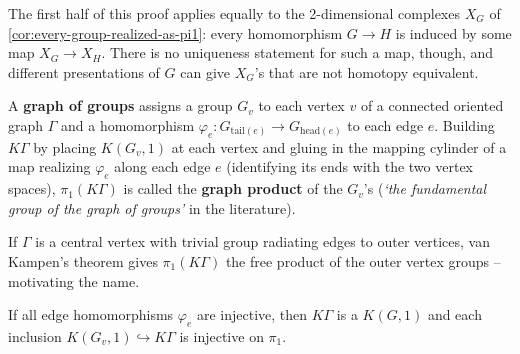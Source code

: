 The first half of this proof applies equally to the 2-dimensional complexes $X_G$ of
\cref{cor:every-group-realized-as-pi1}: every homomorphism $G\to H$ is induced by
some map $X_G\to X_H$. There is no uniqueness statement for such a map, though,
and different presentations of $G$ can give $X_G$'s that are not homotopy equivalent.

\begin{definition}
\label{def:graph-of-groups}
A \textbf{graph of groups} assigns a group $G_v$ to each vertex $v$ of a connected
oriented graph $\Gamma$ and a homomorphism $\varphi_e:G_{\mathrm{tail}(e)}\to G_{\mathrm{head}(e)}$ to
each edge $e$. Building $K\Gamma$ by placing $K(G_v,1)$ at each vertex and gluing in
the mapping cylinder of a map realizing $\varphi_e$ along each edge $e$ (identifying its
ends with the two vertex spaces), $\pi_1(K\Gamma)$ is called the \textbf{graph product} of the
$G_v$'s (\emph{`the fundamental group of the graph of groups'} in the literature).
\end{definition}

If $\Gamma$ is a central vertex with trivial group radiating edges to outer vertices, van
Kampen's theorem gives $\pi_1(K\Gamma)$ the free product of the outer vertex groups --
motivating the name.

\begin{theorem}
\label{thm:graph-of-groups-is-kg1}
If all edge homomorphisms $\varphi_e$ are injective, then $K\Gamma$ is a $K(G,1)$ and each
inclusion $K(G_v,1)\hookrightarrow K\Gamma$ is injective on $\pi_1$.
\end{theorem}

